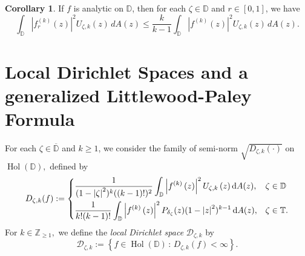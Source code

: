 \documentclass[10pt,oneside,reqno]{amsart}
\theoremstyle{definition}
\newtheorem{corollary}[theorem]{Corollary}
\theoremstyle{remark}
\newcommand{\abs}[1]{\left\lvert #1 \right\rvert}
\renewcommand{\le}{\leqslant}
\renewcommand{\ge}{\geqslant}
\newcommand{\D}{\mathbb D}
\newcommand{\T}{\mathbb T}
\numberwithin{equation}{section}
\begin{document}
\begin{corollary}
    If $f$ is analytic on $\D$, then for each $\zeta \in \D$ and $r \in [0,1]$, we have
    \begin{equation*}
        \int_{\D} \abs{f_r^{(k)}(z)}^2 U_{\zeta, k}(z) \, dA(z) \le \frac{k}{k-1} \int_{\D} \abs{f^{(k)}(z)}^2 U_{\zeta, k}(z) \, dA(z).
    \end{equation*}
    \label{cor:f_r}
\end{corollary}
\section{Local Dirichlet Spaces and a generalized Littlewood-Paley Formula}

For each $\zeta \in \overline{\D }$ and $k \ge 1$, we consider the family of semi-norm $\sqrt{D _{\zeta, k } \left( \cdot \right)}$ on $\operatorname{Hol} \left( \D \right),$  defined by
\begin{equation*}
   D_{\zeta,k} (f) := \begin{dcases} 
        \frac{1}{( 1-\abs{\zeta}^{2} )^{k} ( ( k-1 )! ) ^{2}} \int_{\D} \abs{f^{\left( k \right)}\left( z\right) }^2 U_{\zeta, k} \left( z \right) \mathrm{d}A (z), & \zeta \in \D \\
        \frac{1}{k! (k-1)!} \int_{\D}  \abs{f^{\left( k \right)}\left( z\right) }^2 P_{\delta_{\zeta}}(z) (1-\abs{z}^2)^{k-1} \, \mathrm{d}A(z), & \zeta \in \T.
   \end{dcases}
\end{equation*}
For $k\in \mathbb Z_{\geqslant 1},$ we define the \textit{local Dirichlet space} $\mathscr D_{\zeta,k }$ by
\begin{equation*}
  \mathscr D_{\zeta,k } := \left\{ f \in \operatorname{Hol} \left( \D \right) \, : \, D _{\zeta, k}(f)< \infty \right\}.
\end{equation*}
\end{document}

